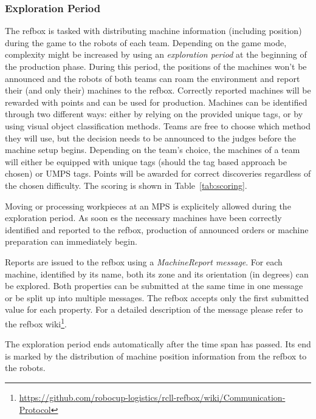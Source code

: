 \documentclass[12pt,twoside]{article}
\newcommand{\reftab}[1]{Table~\ref{#1}}
\begin{document}
\subsubsection{Exploration Period}
\label{sec:exploration-period}

The \ac{refbox} is tasked with distributing machine information
(including position) during the game to the robots of each team.
Depending on the game mode, complexity might be increased by using an
\textit{exploration period} at the beginning of the production phase.
During this period, the positions of the machines won't be announced and the
robots of both teams can roam the environment and report their (and only their)
machines to the \ac{refbox}.
Correctly reported machines will be rewarded with points and can
be used for production. Machines can be identified through two different ways:
either by relying on the provided unique tags, or by using visual object
classification methods.
Teams are free to choose which method they will use, but the
decision needs to be announced to the judges before the machine setup begins.
Depending on the team's choice, the machines of a team will either be equipped
with unique tags (should the tag based approach be chosen) or \ac{UMPS} tags.
Points will be awarded for correct discoveries regardless of the chosen
difficulty.
The scoring is shown in \reftab{tab:scoring}.

Moving or processing workpieces at an \ac{MPS} is explicitely
allowed during the exploration period.
As soon es the necessary machines have been
correctly identified and reported to the \ac{refbox},
production of announced orders or machine preparation can immediately begin.

Reports are issued to the refbox using a \emph{MachineReport message}.
For each machine, identified by its name, both its zone and its orientation
(in degrees) can be explored.
Both properties can be submitted at the same time in one message or be split up
into multiple messages.
The refbox accepts only the first submitted value for each property.
For a detailed description of the message please refer to the \ac{refbox}
wiki\footnote{\url{https://github.com/robocup-logistics/rcll-refbox/wiki/Communication-Protocol}}. %

The exploration period ends automatically after the time span has passed.
Its end is marked by the distribution of machine position information from the
\ac{refbox} to the robots.
\end{document}

